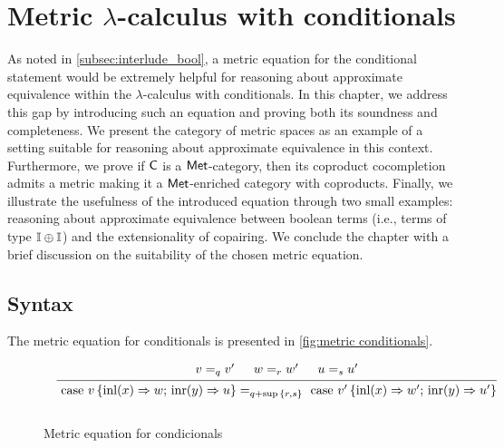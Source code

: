 \chapter{Metric $\lambda$-calculus with conditionals} \label{ch:conditionals}

As noted in \autoref{subsec:interlude_bool}, a metric equation for the conditional statement would be extremely helpful for reasoning about approximate equivalence within the $\lambda$-calculus with conditionals. In this chapter, we address this gap by introducing such an equation and proving both its soundness and completeness. 
We present the category of metric spaces as an example of a setting suitable for reasoning about approximate equivalence in this context. Furthermore, we prove if $\mathsf{C}$ is a $\mathsf{Met}$-category, then its coproduct cocompletion admits a metric making it a $\mathsf{Met}$-enriched category with coproducts.
Finally, we illustrate the usefulness of the introduced equation through two small examples: reasoning about approximate equivalence between boolean terms (i.e., terms of type $\mathbb{I} \oplus \mathbb{I}$) and the extensionality of copairing. We conclude the chapter with a brief discussion on the suitability of the chosen metric equation.






\section{Syntax}

The metric equation for conditionals is presented in \autoref{fig:metric conditionals}. 

\begin{figure}[H]
  \begin{equation*}
  \begin{aligned}
  &
  &
  \begin{prooftree}
      \hypo{ v =_{q} v' }
      \hypo{w=_{r} w'}
      \hypo{u=_{s}u'}
      \infer3[]{\text{ case } v \,   \{\text{inl} (x) \Rightarrow w ; \, \text{inr} (y) \Rightarrow u\} =_{q+\sup{\{ r, s \}}} \text{ case } v' \,  \{\text{inl} (x) \Rightarrow w' ; \,\text{inr} (y) \Rightarrow u'\} }
  \end{prooftree}
  \\[10pt]
  \end{aligned}
  \end{equation*}
  \caption{Metric equation for condicionals}
  \label{fig:metric conditionals}
\end{figure}


